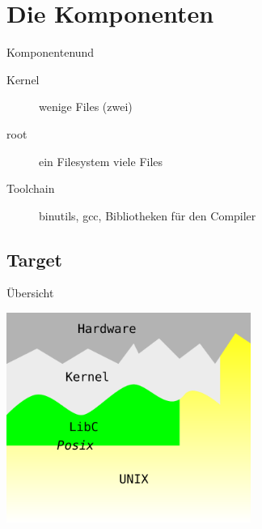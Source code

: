 \section{Die Komponenten}
\begin{frame}{Komponenten}{\target und \host}
 \begin{block}{\target}
  \begin{description}
   \item[Kernel] wenige Files (zwei)
   \item[root] ein Filesystem viele Files
  \end{description}
 \end{block}
 \begin{block}{\host}
  \begin{description}
   \item[Toolchain] binutils, gcc, Bibliotheken für den Compiler
  \end{description}
 \end{block}
\end{frame}
\subsection{Target \target}

\begin{frame}{Übersicht}
 \begin{center}
  \includegraphics[width=8cm]{layers.pdf}
 \end{center}
\end{frame}

